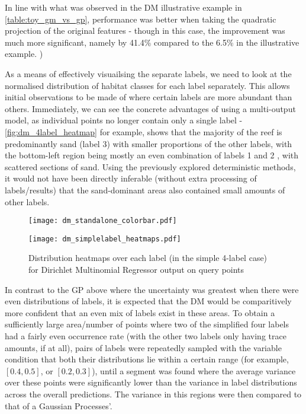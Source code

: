 In line with what was observed in the DM illustrative example in \autoref{table:toy_gm_vs_gp}, performance was better when taking the quadratic projection of the original features - though in this case, the improvement was much more significant, namely by 41.4\% compared to the 6.5\% in the illustrative example. )

As a means of effectively visuailsing the separate labels, we need to look at the normalised distribution of habitat classes for each label separately. This allows initial observations to be made of where certain labels are more abundant than others. Immediately, we can see the concrete advantages of using a multi-output model, as individual points no longer contain only a single label - \autoref{fig:dm_4label_heatmap} for example, shows that the majority of the reef is predominantly sand (label 3) with smaller proportions of the other labels, with the bottom-left region being mostly an even combination of labels 1 and 2 , with scattered sections of sand. Using the previously explored deterministic methods, it would not have been directly inferable (without extra processing of labels/results) that the sand-dominant areas also contained small amounts of other labels.


\begin{figure}[H]
    \begin{minipage}{\linewidth}
        \centerline{\texttt{[image: dm\_standalone\_colorbar.pdf]}}
        \centerline{\texttt{[image: dm\_simplelabel\_heatmaps.pdf]}}
        \caption{Distribution heatmaps over each label (in the simple 4-label case) for Dirichlet Multinomial Regressor output on query points}
        \label{fig:dm_4label_heatmap}
    \end{minipage}
    \hfill
\end{figure}

In contrast to the GP above where the uncertainty was greatest when there were even distributions of labels, it is expected that the DM would be comparitively more confident that an even mix of labels exist in these areas. To obtain a sufficiently large area/number of points where two of the simplified four labels had a fairly even occurrence rate (with the other two labels only having trace amounts, if at all), pairs of labels were repeatedly sampled with the variable condition that both their distributions lie within a certain range (for example, $[0.4, 0.5]$, or $[0.2, 0.3]$), until a segment was found where the average variance over these points were significantly lower than the variance in label distributions across the overall predictions. The variance in this regions were then compared to that of a Gaussian Processes'.

